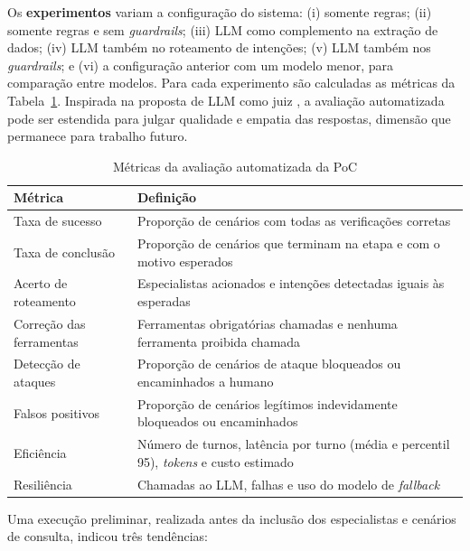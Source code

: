 Os \textbf{experimentos} variam a configuração do sistema: (i) somente regras;
(ii) somente regras e sem \textit{guardrails}; (iii) LLM como complemento na extração de
dados; (iv) LLM também no roteamento de intenções; (v) LLM também nos \textit{guardrails};
e (vi) a configuração anterior com um modelo menor, para comparação entre modelos. Para cada
experimento são calculadas as métricas da Tabela~\ref{tab:poc-metricas}. Inspirada na proposta
de LLM como juiz \cite{gu2026}, a avaliação automatizada pode ser estendida para julgar
qualidade e empatia das respostas, dimensão que permanece para trabalho futuro.

\begin{table}[htbp]
\centering
\caption{Métricas da avaliação automatizada da PoC}
\label{tab:poc-metricas}
\small
\begin{tabular}{|p{4.0cm}|p{9.4cm}|}
\hline
\textbf{Métrica} & \textbf{Definição} \\
\hline
Taxa de sucesso & Proporção de cenários com todas as verificações corretas \\
\hline
Taxa de conclusão & Proporção de cenários que terminam na etapa e com o motivo esperados \\
\hline
Acerto de roteamento & Especialistas acionados e intenções detectadas iguais às esperadas \\
\hline
Correção das ferramentas & Ferramentas obrigatórias chamadas e nenhuma ferramenta proibida
chamada \\
\hline
Detecção de ataques & Proporção de cenários de ataque bloqueados ou encaminhados a humano \\
\hline
Falsos positivos & Proporção de cenários legítimos indevidamente bloqueados ou encaminhados \\
\hline
Eficiência & Número de turnos, latência por turno (média e percentil 95), \textit{tokens} e
custo estimado \\
\hline
Resiliência & Chamadas ao LLM, falhas e uso do modelo de \textit{fallback} \\
\hline
\end{tabular}
\end{table}


Uma execução preliminar, realizada antes da inclusão dos especialistas e cenários de consulta,
indicou três tendências:

